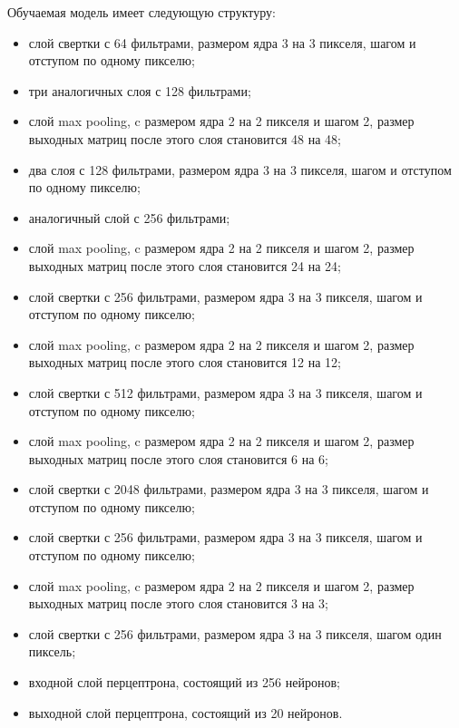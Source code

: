 Обучаемая модель имеет следующую структуру:
\begin{itemize}
	\item слой свертки с 64 фильтрами, размером ядра 3 на 3 пикселя, шагом и отступом по одному пикселю;
	\item три аналогичных слоя с 128 фильтрами;
	\item слой max pooling, c размером ядра 2 на 2 пикселя и шагом 2, размер выходных матриц после этого слоя становится 48 на 48;
	\item два слоя с 128 фильтрами, размером ядра 3 на 3 пикселя, шагом и отступом по одному пикселю;
	\item аналогичный слой с 256 фильтрами;
	\item слой max pooling, c размером ядра 2 на 2 пикселя и шагом 2, размер выходных матриц после этого слоя становится 24 на 24;
	\item слой свертки с 256 фильтрами, размером ядра 3 на 3 пикселя, шагом и отступом по одному пикселю;
	\item слой max pooling, c размером ядра 2 на 2 пикселя и шагом 2, размер выходных матриц после этого слоя становится 12 на 12;
	\item слой свертки с 512 фильтрами, размером ядра 3 на 3 пикселя, шагом и отступом по одному пикселю;
	\item слой max pooling, c размером ядра 2 на 2 пикселя и шагом 2, размер выходных матриц после этого слоя становится 6 на 6;
	\item слой свертки с 2048 фильтрами, размером ядра 3 на 3 пикселя, шагом и отступом по одному пикселю;
	\item слой свертки с 256 фильтрами, размером ядра 3 на 3 пикселя, шагом и отступом по одному пикселю;
	\item слой max pooling, c размером ядра 2 на 2 пикселя и шагом 2, размер выходных матриц после этого слоя становится 3 на 3;
	\item слой свертки с 256 фильтрами, размером ядра 3 на 3 пикселя, шагом один пиксель;
	\item входной слой перцептрона, состоящий из 256 нейронов;
	\item выходной слой перцептрона, состоящий из 20 нейронов.
\end{itemize}

